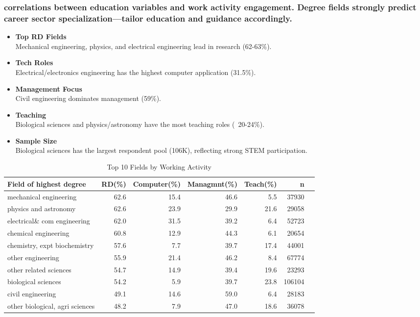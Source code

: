 \documentclass[12pt]{article}
\begin{document}
\subsubsection{correlations between education variables and work activity engagement. Degree fields strongly predict career sector specialization—tailor education and guidance accordingly.}

\begin{itemize}
    \item \textbf{Top RD Fields} \\
    Mechanical engineering, physics, and electrical engineering lead in research (62-63\%).
    \item \textbf{Tech Roles} \\
    Electrical/electronics engineering has the highest computer application (31.5\%).
    \item \textbf{Management Focus} \\
    Civil engineering dominates management (59\%).
    \item \textbf{Teaching} \\
    Biological sciences and physics/astronomy have the most teaching roles (~20-24\%).
    \item \textbf{Sample Size} \\
    Biological sciences has the largest respondent pool (106K), reflecting strong STEM participation.
\end{itemize}


\begin{table}[H]
\centering
\begin{tabular}{|l|r|r|r|r|r|r|}
  \toprule
  \hline
Field of highest degree & RD(\%) & Computer(\%) & Managmnt(\%) & Teach(\%) & n \\ \hline
  \midrule
mechanical engineering & 62.6 & 15.4 & 46.6 & 5.5 & 37930 \\ \hline
  physics and astronomy & 62.6 & 23.9 & 29.9 & 21.6 & 29058 \\ \hline
  electrical\& com engineering & 62.0 & 31.5 & 39.2 & 6.4 & 52723 \\ \hline
  chemical engineering & 60.8 & 12.9 & 44.3 & 6.1 & 20654 \\ \hline
  chemistry, expt biochemistry & 57.6 & 7.7 & 39.7 & 17.4 & 44001 \\ \hline
  other engineering & 55.9 & 21.4 & 46.2 & 8.4 & 67774 \\ \hline
  other related sciences & 54.7 & 14.9 & 39.4 & 19.6 & 23293 \\ \hline
  biological sciences & 54.2 & 5.9 & 39.7 & 23.8 & 106104 \\ \hline
  civil engineering & 49.1 & 14.6 & 59.0 & 6.4 & 28183 \\ \hline
  other biological, agri sciences & 48.2 & 7.9 & 47.0 & 18.6 & 36078 \\ \hline
   \bottomrule
\end{tabular}
\caption{Top 10 Fields by Working Activity} 
\label{tab:work_by_field}
\end{table}
\end{document}
